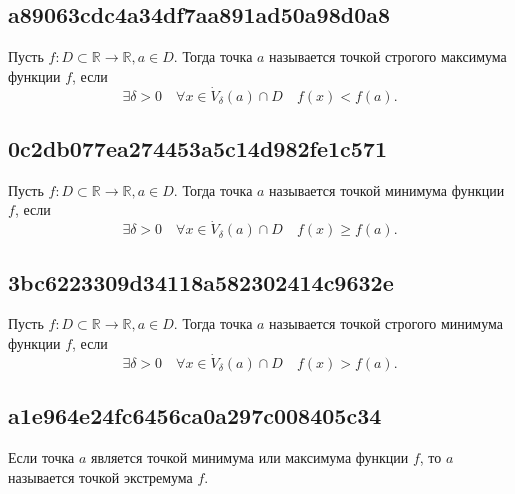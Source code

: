 \documentclass[11pt, a5paper]{article}
\newenvironment{note}[1]{\goodbreak\par\subsection{\hfill \color{lightgray}\tiny #1}}{}
\newenvironment{icloze}[2][\ldots]{%
  \ignorespaces\text{\tiny \color{lightgray}\{#2} %
}{%
  \text{\tiny\color{lightgray}\}}\unskip%
}
\begin{document}
\begin{note}{a89063cdc4a34df7aa891ad50a98d0a8}
    Пусть \( f : D \subset \mathbb R \to \mathbb R, a \in D \). Тогда точка \( a \) называется \begin{icloze}{2}точкой строгого максимума функции \( f \),\end{icloze} если
    \begin{icloze}{1}\[
        \exists \delta > 0 \quad \forall x \in \dot V_{\delta} (a) \cap D \quad f(x) < f(a).
    \]\end{icloze}
\end{note}

\begin{note}{0c2db077ea274453a5c14d982fe1c571}
    Пусть \( f : D \subset \mathbb R \to \mathbb R, a \in D \). Тогда точка \( a \) называется \begin{icloze}{2}точкой минимума функции \( f \),\end{icloze} если
    \begin{icloze}{1}\[
        \exists \delta > 0 \quad \forall x \in \dot V_{\delta} (a) \cap D \quad f(x) \geqslant f(a).
    \]\end{icloze}
\end{note}

\begin{note}{3bc6223309d34118a582302414c9632e}
    Пусть \( f : D \subset \mathbb R \to \mathbb R, a \in D \). Тогда точка \( a \) называется \begin{icloze}{2}точкой строгого минимума функции \( f \),\end{icloze} если
    \begin{icloze}{1}\[
        \exists \delta > 0 \quad \forall x \in \dot V_{\delta} (a) \cap D \quad f(x) > f(a).
    \]\end{icloze}
\end{note}

\begin{note}{a1e964e24fc6456ca0a297c008405c34}
    Если \begin{icloze}{2}точка \( a \) является точкой минимума или максимума функции \( f \),\end{icloze} то \( a \) называется \begin{icloze}{1}точкой экстремума \( f \).\end{icloze}
\end{note}
\end{document}
